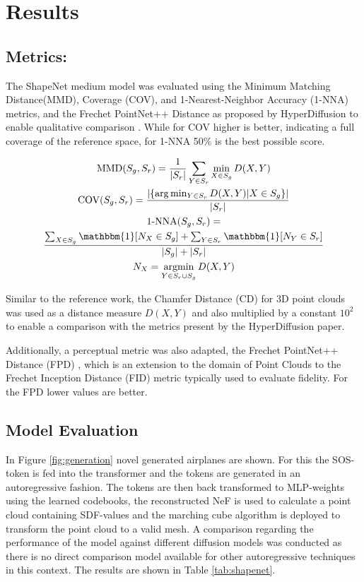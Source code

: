 


\section{Results}

\subsection*{Metrics: }

The ShapeNet medium model was evaluated using the Minimum Matching Distance(MMD), Coverage (COV), and 1-Nearest-Neighbor Accuracy (1-NNA) metrics, and the Frechet PointNet++ Distance as proposed by HyperDiffusion to enable qualitative comparison \cite{erkoç2023hyperdiffusion}.
While for COV higher is better, indicating a full coverage of the reference space, for 1-NNA 50\% is the best possible score.

\begin{gather*}
  \mathrm{MMD}(S_g,S_r) =\frac{1}{|S_{r}|}\sum_{Y\in S_{r}}\min_{X\in S_{g}}D(X,Y)\\
  \text{COV}(S_g,S_r) =\frac{|\{\arg\min_{Y\in S_r}D(X,Y)|X\in S_g\}|}{|S_r|}\\
  \text{1-NNA}(S_g,S_r) =\\
  \frac{\sum_{X\in S_g}\mathbbm{1}[N_X\in S_g]+\sum_{Y\in S_r}\mathbbm{1}[N_Y\in S_r]}{|S_g|+|S_r|}\\
  N_X = \underset{Y\in S_r \cup S_g}{\text{argmin}} \, D(X,Y) \\
\end{gather*}

Similar to the reference work, the Chamfer Distance (CD) for 3D point clouds was used as a distance measure $D(X, Y)$ and also multiplied by a constant $10^2$ to enable a comparison with the metrics present by the HyperDiffusion paper.

Additionally, a perceptual metric was also adapted, the Frechet PointNet++ Distance (FPD) \cite{qi2017pointnetdeephierarchicalfeature}, which is an extension to the domain of Point Clouds to the Frechet Inception Distance (FID) metric \cite{NIPS2017_8a1d6947} typically used to evaluate fidelity. For the FPD lower values are better.

\subsection*{Model Evaluation}
In Figure \ref{fig:generation} novel generated airplanes are shown. For this the SOS-token is fed into the transformer and the tokens are generated in an autoregressive fashion. The tokens are then back transformed to MLP-weights using the learned codebooks, the reconstructed NeF is used to calculate a point cloud containing SDF-values and the marching cube algorithm is deployed to transform the point cloud to a valid mesh.
A comparison regarding the performance of the model against different diffusion models was conducted as there is no direct comparison model available for other autoregressive techniques in this context. The results are shown in Table \ref{tab:shapenet}.

